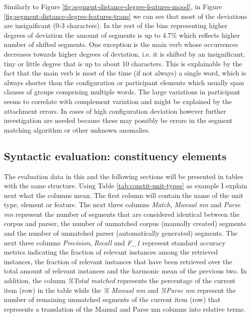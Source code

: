     Similarly to Figure \ref{fig:segment-distance-degree-features-mood}, in Figure \ref{fig:segment-distance-degree-features-trans} we can see that most of the deviations are insignificant (0-3 characters). In the rest of the bins representing higher degrees of deviation the amount of segments is up to 4.7\% which reflects higher number of shifted segments. One exception is the main verb whose occurrences decreases towards higher degrees of deviation, i.e. it is shifted by an insignificant, tiny or little degree that is up to about 10 characters. This is explainable by the fact that the main verb is most of the time (if not always) a single word, which is always shorter than the configuration or participant elements which usually span clauses of groups comprising multiple words. The large variations in participant seems to correlate with complement variation and might be explained by the attachment errors. In cases of high configuration deviation however further investigation are needed because these may possibly be errors in the segment matching algorithm or other unknown anomalies.

\subsection{Syntactic evaluation: constituency elements}
\label{sec:syntactic-constituents}
    The evaluation data in this and the following sections will be presented in tables with the same structure. Using Table \ref{tab:constit-unit-types} as example I explain next what the columns mean. The first column will contain the name of the unit type, element or feature. The next three columns \textit{Match}, \textit{Manual mn} and \textit{Parse mn} represent the number of segments that are considered identical between the corpus and parser, the number of unmatched corpus (manually created) segments and the number of unmatched parser (automatically generated) segments. The next three columns \textit{Precision}, \textit{Recall} and \textit{F_1} represent standard accuracy metrics indicating the fraction of relevant instances among the retrieved instances, the fraction of relevant instances that have been retrieved over the total amount of relevant instances and the harmonic mean of the previous two. In addition, the column \textit{\%Total matched} represents the percentage of the current item (row) in the table while the \textit{\% Manual nm} and \textit{\%Parse nm} represent the number of remaining unmatched segments of the current item (row) that represents a translation of the Manual and Parse mn columns into relative terms. 

